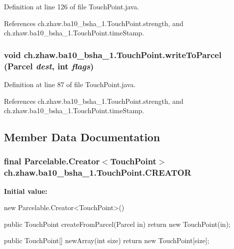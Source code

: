 Definition at line 126 of file TouchPoint.java.

References ch.zhaw.ba10\_\-bsha\_\-1.TouchPoint.strength, and ch.zhaw.ba10\_\-bsha\_\-1.TouchPoint.timeStamp.\hypertarget{classch_1_1zhaw_1_1ba10__bsha__1_1_1TouchPoint_a8cfc22332015bceee96d2fdafc321290}{
\subsubsection[{writeToParcel}]{\setlength{\rightskip}{0pt plus 5cm}void ch.zhaw.ba10\_\-bsha\_\-1.TouchPoint.writeToParcel (Parcel {\em dest}, \/  int {\em flags})}}
\label{classch_1_1zhaw_1_1ba10__bsha__1_1_1TouchPoint_a8cfc22332015bceee96d2fdafc321290}


Definition at line 87 of file TouchPoint.java.

References ch.zhaw.ba10\_\-bsha\_\-1.TouchPoint.strength, and ch.zhaw.ba10\_\-bsha\_\-1.TouchPoint.timeStamp.

\subsection{Member Data Documentation}
\hypertarget{classch_1_1zhaw_1_1ba10__bsha__1_1_1TouchPoint_a0f386eacc8abbc547cd2a5b23630d211}{
\subsubsection[{CREATOR}]{\setlength{\rightskip}{0pt plus 5cm}final Parcelable.Creator$<${\bf TouchPoint}$>$ {\bf ch.zhaw.ba10\_\-bsha\_\-1.TouchPoint.CREATOR}}}
\label{classch_1_1zhaw_1_1ba10__bsha__1_1_1TouchPoint_a0f386eacc8abbc547cd2a5b23630d211}
{\bfseries Initial value:}
\begin{DoxyCode}
 new Parcelable.Creator<TouchPoint>() {
                public TouchPoint createFromParcel(Parcel in) {
                        return new TouchPoint(in);
                }

                public TouchPoint[] newArray(int size) {
                        return new TouchPoint[size];
                }
        }
\end{DoxyCode}


